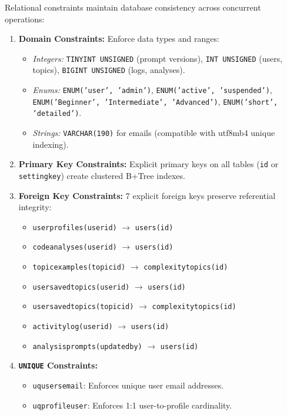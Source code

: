 \documentclass[12pt,a4paper]{report}
\DeclareRobustCommand{\_}{\textunderscore\allowbreak}
\begin{document}
Relational constraints maintain database consistency across concurrent operations:
\begin{enumerate}
    \item \textbf{Domain Constraints:} Enforce data types and ranges:
    \begin{itemize}
        \item \textit{Integers:} \texttt{TINYINT UNSIGNED} (prompt versions), \texttt{INT UNSIGNED} (users, topics), \texttt{BIGINT UNSIGNED} (logs, analyses).
        \item \textit{Enums:} \texttt{ENUM('user', 'admin')}, \texttt{ENUM('active', 'suspended')}, \texttt{ENUM('Beginner', 'Intermediate', 'Advanced')}, \texttt{ENUM('short', 'detailed')}.
        \item \textit{Strings:} \texttt{VARCHAR(190)} for emails (compatible with utf8mb4 unique indexing).
    \end{itemize}
    \item \textbf{Primary Key Constraints:} Explicit primary keys on all tables (\texttt{id} or \texttt{setting\_key}) create clustered B+Tree indexes.
    \item \textbf{Foreign Key Constraints:} 7 explicit foreign keys preserve referential integrity:
    \begin{itemize}
        \item \texttt{user\_profiles(user\_id)} $\rightarrow$ \texttt{users(id)}
        \item \texttt{code\_analyses(user\_id)} $\rightarrow$ \texttt{users(id)}
        \item \texttt{topic\_examples(topic\_id)} $\rightarrow$ \texttt{complexity\_topics(id)}
        \item \texttt{user\_saved\_topics(user\_id)} $\rightarrow$ \texttt{users(id)}
        \item \texttt{user\_saved\_topics(topic\_id)} $\rightarrow$ \texttt{complexity\_topics(id)}
        \item \texttt{activity\_log(user\_id)} $\rightarrow$ \texttt{users(id)}
        \item \texttt{analysis\_prompts(updated\_by)} $\rightarrow$ \texttt{users(id)}
    \end{itemize}
    \item \textbf{\texttt{UNIQUE} Constraints:}
    \begin{itemize}
        \item \texttt{uq\_users\_email}: Enforces unique user email addresses.
        \item \texttt{uq\_profile\_user}: Enforces 1:1 user-to-profile cardinality.

\end{itemize}
\end{enumerate}
\end{document}
